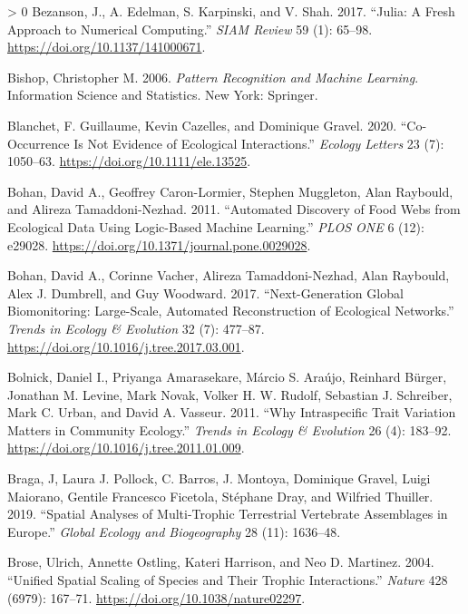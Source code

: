 \documentclass[11pt]{article}
\newlength{\cslhangindent}
\newenvironment{CSLReferences}[3] %
 {%
  \setlength{\parindent}{0pt}
  \ifodd #1 \everypar{\setlength{\hangindent}{\cslhangindent}}\ignorespaces\fi
  \ifnum #2 > 0
  \setlength{\parskip}{#2\baselineskip}
  \fi
 }%
 {}
\begin{document}
\begin{CSLReferences}{1}{0}
\leavevmode\hypertarget{ref-Bezanson2017JulFre}{}%
Bezanson, J., A. Edelman, S. Karpinski, and V. Shah. 2017. {``Julia: A
Fresh Approach to Numerical Computing.''} \emph{SIAM Review} 59 (1):
65--98. \url{https://doi.org/10.1137/141000671}.

\leavevmode\hypertarget{ref-Bishop2006PatRec}{}%
Bishop, Christopher M. 2006. \emph{Pattern Recognition and Machine
Learning}. Information Science and Statistics. New York: Springer.

\leavevmode\hypertarget{ref-Blanchet2020CooNot}{}%
Blanchet, F. Guillaume, Kevin Cazelles, and Dominique Gravel. 2020.
{``Co-Occurrence Is Not Evidence of Ecological Interactions.''}
\emph{Ecology Letters} 23 (7): 1050--63.
\url{https://doi.org/10.1111/ele.13525}.

\leavevmode\hypertarget{ref-Bohan2011AutDis}{}%
Bohan, David A., Geoffrey Caron-Lormier, Stephen Muggleton, Alan
Raybould, and Alireza Tamaddoni-Nezhad. 2011. {``Automated Discovery of
Food Webs from Ecological Data Using Logic-Based Machine Learning.''}
\emph{PLOS ONE} 6 (12): e29028.
\url{https://doi.org/10.1371/journal.pone.0029028}.

\leavevmode\hypertarget{ref-Bohan2017NexGlo}{}%
Bohan, David A., Corinne Vacher, Alireza Tamaddoni-Nezhad, Alan
Raybould, Alex J. Dumbrell, and Guy Woodward. 2017. {``Next-Generation
Global Biomonitoring: Large-Scale, Automated Reconstruction of
Ecological Networks.''} \emph{Trends in Ecology \& Evolution} 32 (7):
477--87. \url{https://doi.org/10.1016/j.tree.2017.03.001}.

\leavevmode\hypertarget{ref-Bolnick2011WhyInt}{}%
Bolnick, Daniel I., Priyanga Amarasekare, Márcio S. Araújo, Reinhard
Bürger, Jonathan M. Levine, Mark Novak, Volker H. W. Rudolf, Sebastian
J. Schreiber, Mark C. Urban, and David A. Vasseur. 2011. {``Why
Intraspecific Trait Variation Matters in Community Ecology.''}
\emph{Trends in Ecology \& Evolution} 26 (4): 183--92.
\url{https://doi.org/10.1016/j.tree.2011.01.009}.

\leavevmode\hypertarget{ref-Braga2019SpaAna}{}%
Braga, J, Laura J. Pollock, C. Barros, J. Montoya, Dominique Gravel,
Luigi Maiorano, Gentile Francesco Ficetola, Stéphane Dray, and Wilfried
Thuiller. 2019. {``Spatial Analyses of Multi-Trophic Terrestrial
Vertebrate Assemblages in Europe.''} \emph{Global Ecology and
Biogeography} 28 (11): 1636--48.

\leavevmode\hypertarget{ref-Brose2004UniSpa}{}%
Brose, Ulrich, Annette Ostling, Kateri Harrison, and Neo D. Martinez.
2004. {``Unified Spatial Scaling of Species and Their Trophic
Interactions.''} \emph{Nature} 428 (6979): 167--71.
\url{https://doi.org/10.1038/nature02297}.


\end{CSLReferences}
\end{document}

